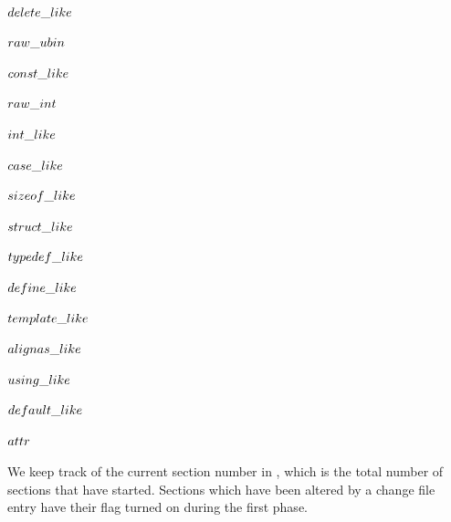 \par
\B\4\D$\\{delete\_like}$ \5
\par
\B\4\D$\\{raw\_ubin}$ \5
\par
\B\4\D$\\{const\_like}$ \5
\par
\B\4\D$\\{raw\_int}$ \5
\par
\B\4\D$\\{int\_like}$ \5
\par
\B\4\D$\\{case\_like}$ \5
\par
\B\4\D$\\{sizeof\_like}$ \5
\par
\B\4\D$\\{struct\_like}$ \5
\par
\B\4\D$\\{typedef\_like}$ \5
\par
\B\4\D$\\{define\_like}$ \5
\par
\B\4\D$\\{template\_like}$ \5
\par
\B\4\D$\\{alignas\_like}$ \5
\par
\B\4\D$\\{using\_like}$ \5
\par
\B\4\D$\\{default\_like}$ \5
\par
\B\4\D$\\{attr}$ \5
\par
\fi

We keep track of the current section number in ,
which
is the total number of sections that have started.  Sections which have
been altered by a change file entry have their  flag
turned on during the first phase.

